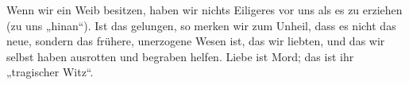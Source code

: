 Wenn wir ein Weib besitzen, haben wir nichts Eiligeres vor uns als es zu erziehen (zu uns „hinan“). Ist das gelungen, so merken wir zum Unheil, dass es nicht das neue, sondern das frühere, unerzogene Wesen ist, das wir liebten, und das wir selbst haben ausrotten und begraben helfen. Liebe ist Mord; das ist ihr „tragischer Witz“.
\par

